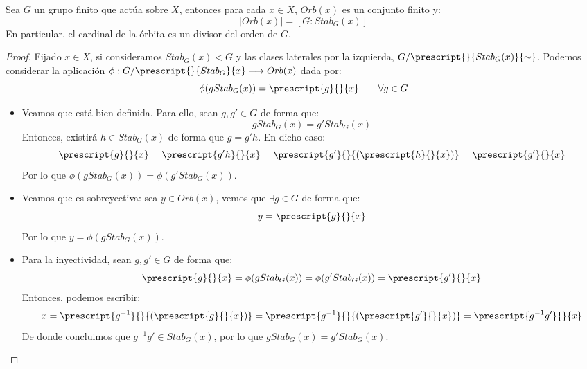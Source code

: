 \begin{prop}
   Sea $G$ un grupo finito que actúa sobre $X$, entonces para cada $x\in X$, $Orb(x)$ es un conjunto finito y:
   \begin{equation*}
       |Orb(x)| = [G:Stab_G(x)]
   \end{equation*}
   En particular, el cardinal de la órbita es un divisor del orden de $G$.
   \begin{proof}
       Fijado $x\in X$, si consideramos $Stab_G(x) < G$ y las clases laterales por la izquierda, $G/\prescript{}{Stab_G(x)}{\sim}$. Podemos considerar la aplicación $\phi:G/\prescript{}{Stab_G}{x}\longrightarrow Orb(x)$ dada por:
       \begin{equation*}
           \phi(gStab_G(x)) = \prescript{g}{}{x} \qquad \forall g\in G
       \end{equation*}
       \begin{itemize}
           \item Veamos que está bien definida. Para ello, sean $g,g' \in G$ de forma que:
               \begin{equation*}
                   gStab_G(x) = g'Stab_G(x)
               \end{equation*}
               Entonces, existirá $h\in Stab_G(x)$ de forma que $g = g'h$. En dicho caso:
               \begin{equation*}
                   \prescript{g}{}{x} = \prescript{g'h}{}{x} = \prescript{g'}{}{(\prescript{h}{}{x})} = \prescript{g'}{}{x}
               \end{equation*}
               Por lo que $\phi(gStab_G(x)) = \phi(g'Stab_G(x))$.
           \item Veamos que es sobreyectiva: sea $y\in Orb(x)$, vemos que $\exists g\in G$ de forma que:
               \begin{equation*}
                   y = \prescript{g}{}{x}
               \end{equation*}
               Por lo que $y = \phi(gStab_G(x))$.
           \item Para la inyectividad, sean $g,g'\in G$ de forma que:
               \begin{equation*}
                   \prescript{g}{}{x} = \phi(gStab_G(x)) = \phi(g'Stab_G(x)) = \prescript{g'}{}{x}
               \end{equation*}
               Entonces, podemos escribir:
               \begin{equation*}
                   x = \prescript{g^{-1}}{}{(\prescript{g}{}{x})} = \prescript{g^{-1}}{}{(\prescript{g'}{}{x})} = \prescript{g^{-1}g'}{}{x}
               \end{equation*}
               De donde concluimos que $g^{-1}g'\in Stab_G(x)$, por lo que $gStab_G(x) = g'Stab_G(x)$. \qedhere
       \end{itemize}
   \end{proof}
\end{prop}

